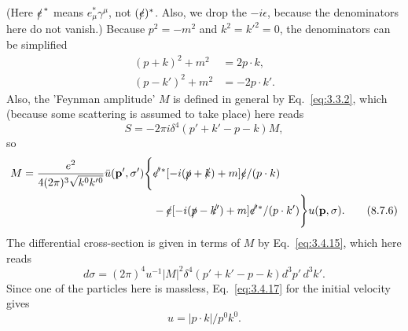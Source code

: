 (Here $\sl{e}^{\,*}$ means $e^*_\mu\gamma^\mu$, not $(\sl{e})^*$.
Also, we drop the $-i\epsilon$, because the denominators here do not
vanish.) Because $p^2=-m^2$ and $k^2=k'^2=0$, the denominators can be
simplified
\begin{align}
(p+k)^2+m^2&=2p\cdot k,
\tag{8.7.3}\label{eq:8.7.3}\\
(p-k')^2+m^2&=-2p\cdot k'.
\tag{8.7.4}\label{eq:8.7.4}
\end{align}
Also, the 'Feynman amplitude' $M$ is defined in general by Eq.~\eqref{eq:3.3.2},
which (because some scattering is assumed to take place) here reads
\begin{equation}
S=-2\pi i\delta^4(p'+k'-p-k)M,
\tag{8.7.5}\label{eq:8.7.5}
\end{equation}
so
\begin{align}
M={e^2\over4(2\pi)^3\sqrt{k^0k'{}^0}}\bar u(\mathbf p',\sigma')
\Biggl\{&\sl{e'}{}^*[-i(\sl{p}+\sl{k})+m]\sl{e}/(p\cdot k)
\notag\\
&-\sl{e}[-i(\sl{p}-\sl{k'})+m]\sl{e'}{}^*/(p\cdot k')\Biggr\}
u(\mathbf p,\sigma).
\tag{8.7.6}\label{eq:8.7.6}
\end{align}
The differential cross-section is given in terms of $M$ by Eq.~\eqref{eq:3.4.15},
which here reads
\begin{equation}
d\sigma=(2\pi)^4u^{-1}|M|^2\delta^4(p'+k'-p-k)d^3p'\,d^3k'.
\tag{8.7.7}\label{eq:8.7.7}
\end{equation}
Since one of the particles here is massless, Eq.~\eqref{eq:3.4.17} for the initial
velocity gives
\begin{equation}
u=|p\cdot k|/p^0k^0.
\tag{8.7.8}\label{eq:8.7.8}
\end{equation}

